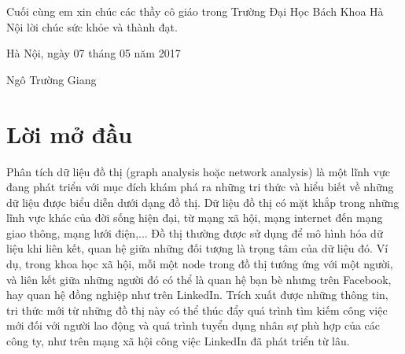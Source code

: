 \documentclass[14pt, oneside, a4paper, openany]{scrartcl}
\begin{document}
Cuối cùng em xin chúc các thầy cô giáo trong Trường Đại Học Bách Khoa Hà Nội lời chúc sức khỏe và thành đạt.

\begin{flushright}
	Hà Nội, ngày 07 tháng 05 năm 2017
\end{flushright}
\hspace{95 mm}Ngô Trường Giang

\newpage
\section{Lời mở đầu}
Phân tích dữ liệu đồ thị (graph analysis hoặc network analysis) là một lĩnh vực đang phát triển với mục đích khám phá ra những tri thức và hiểu biết về những dữ liệu được biểu diễn dưới dạng đồ thị.
Dữ liệu đồ thị có mặt khắp trong những lĩnh vực khác của đời sống hiện đại, từ mạng xã hội, mạng internet đến mạng giao thông, mạng lưới điện,...
Đồ thị thường được sử dụng để mô hình hóa dữ liệu khi liên kết, quan hệ giữa những đối tượng là trọng tâm của dữ liệu đó.
Ví dụ, trong khoa học xã hội, mỗi một node trong đồ thị tướng ứng với một người, và liên kết giữa những người đó có thể là quan hệ bạn bè nhưng trên Facebook, hay quan hệ đồng nghiệp như trên LinkedIn.
Trích xuất được những thông tin, tri thức mới từ những đồ thị này có thể thúc đẩy quá trình tìm kiếm công việc mới đối với người lao động và quá trình tuyển dụng nhân sự phù hợp của các công ty, như trên mạng xã hội công việc LinkedIn đã phát triển từ lâu.
\end{document}
